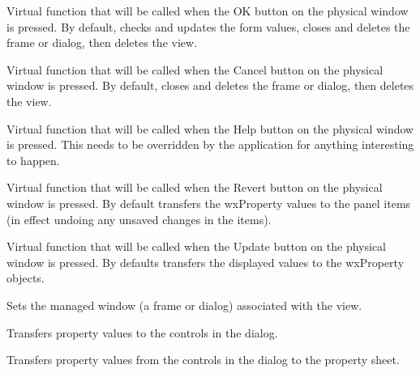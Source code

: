 \label{wxpropertyformviewonok}


Virtual function that will be called when the OK button on the physical window is pressed.
By default, checks and updates the form values, closes and deletes the frame or dialog, then deletes the view.

\label{wxpropertyformviewoncancel}


Virtual function that will be called when the Cancel button on the physical window is pressed.
By default, closes and deletes the frame or dialog, then deletes the view.

\label{wxpropertyformviewonhelp}


Virtual function that will be called when the Help button on the physical window is pressed.
This needs to be overridden by the application for anything interesting to happen.

\label{wxpropertyformviewonrevert}


Virtual function that will be called when the Revert button on the physical window is pressed.
By default transfers the wxProperty values to the panel items (in effect
undoing any unsaved changes in the items).

\label{wxpropertyformviewonupdate}


Virtual function that will be called when the Update button on the physical window is pressed.
By defaults transfers the displayed values to the wxProperty objects.

\label{wxpropertyformviewsetmanagedwindow}


Sets the managed window (a frame or dialog) associated with the view.

\label{wxpropertyformviewtransfertodialog}


Transfers property values to the controls in the dialog.

\label{wxpropertyformviewtransfertopropertysheet}


Transfers property values from the controls in the dialog to the property sheet.


